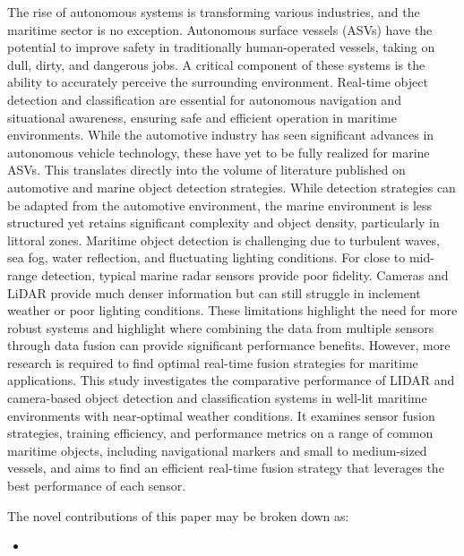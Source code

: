 \documentclass{erauthesis}
\begin{document}
The rise of autonomous systems is transforming various industries, and the maritime sector is no exception. Autonomous surface vessels (ASVs) have the potential to improve safety in traditionally human-operated vessels, taking on dull, dirty, and dangerous jobs.
A critical component of these systems is the ability to accurately perceive the surrounding environment. 
Real-time object detection and classification are essential for autonomous navigation and situational awareness, ensuring safe and efficient operation in maritime environments. 
While the automotive industry has seen significant advances in autonomous vehicle technology, these have yet to be fully realized for marine ASVs.
This translates directly into the volume of literature published on automotive and marine object detection strategies. 
While detection strategies can be adapted from the automotive environment, the marine environment is less structured yet retains significant complexity and object density, particularly in littoral zones.
Maritime object detection is challenging due to turbulent waves, sea fog, water reflection, and fluctuating lighting conditions. 
For close to mid-range detection, typical marine radar sensors provide poor fidelity.
Cameras and LiDAR provide much denser information but can still struggle in inclement weather or poor lighting conditions. 
These limitations highlight the need for more robust systems and highlight where combining the data from multiple sensors through data fusion can provide significant performance benefits. 
However, more research is required to find optimal real-time fusion strategies for maritime applications.
This study investigates the comparative performance of LIDAR and camera-based object detection and classification systems in well-lit maritime environments with near-optimal weather conditions. 
It examines sensor fusion strategies, training efficiency, and performance metrics on a range of common maritime objects, including navigational markers and small to medium-sized vessels, and aims to find an efficient real-time fusion strategy that leverages the best performance of each sensor.

The novel contributions of this paper may be broken down as:
\begin{itemize}
    \item 
\end{itemize}

\end{document}
